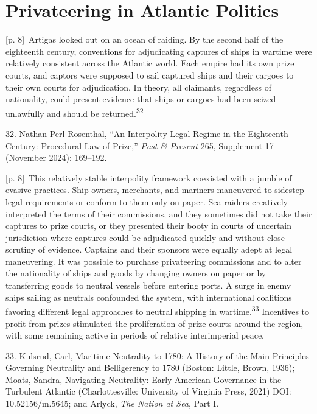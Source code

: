 \documentclass[10pt,a4paper]{article}
\begin{document}
\section*{Privateering in Atlantic Politics}
{\scriptsize\color{gray} [p. 8]}\ Artigas looked out on an ocean of raiding. By the second half of the eighteenth century, conventions for adjudicating captures of ships in wartime were relatively consistent across the Atlantic world. Each empire had its own prize courts, and captors were supposed to sail captured ships and their cargoes to their own courts for adjudication. In theory, all claimants, regardless of nationality, could present evidence that ships or cargoes had been seized unlawfully and should be returned.\nobreak\textsuperscript{32}\par{\small 32. Nathan Perl-Rosenthal, “An Interpolity Legal Regime in the Eighteenth Century: Procedural Law of Prize,” \textit{Past \& Present} 265, Supplement 17 (November 2024): 169–192.\par}
{\scriptsize\color{gray} [p. 8]}\ This relatively stable interpolity framework coexisted with a jumble of evasive practices. Ship owners, merchants, and mariners maneuvered to sidestep legal requirements or conform to them only on paper. Sea raiders creatively interpreted the terms of their commissions, and they sometimes did not take their captures to prize courts, or they presented their booty in courts of uncertain jurisdiction where captures could be adjudicated quickly and without close scrutiny of evidence. Captains and their sponsors were equally adept at legal maneuvering. It was possible to purchase privateering commissions and to alter the nationality of ships and goods by changing owners on paper or by transferring goods to neutral vessels before entering ports. A surge in enemy ships sailing as neutrals confounded the system, with international coalitions favoring different legal approaches to neutral shipping in wartime.\nobreak\textsuperscript{33} Incentives to profit from prizes stimulated the proliferation of prize courts around the region, with some remaining active in periods of relative interimperial peace.\par{\small 33. Kulsrud, Carl, Maritime Neutrality to 1780: A History of the Main Principles Governing Neutrality and Belligerency to 1780 (Boston: Little, Brown, 1936); Moats, Sandra, Navigating Neutrality: Early American Governance in the Turbulent Atlantic (Charlottesville: University of Virginia Press, 2021) DOI: 10.52156/m.5645; and Arlyck, \textit{The Nation at Sea}, Part I.\par}
\end{document}
